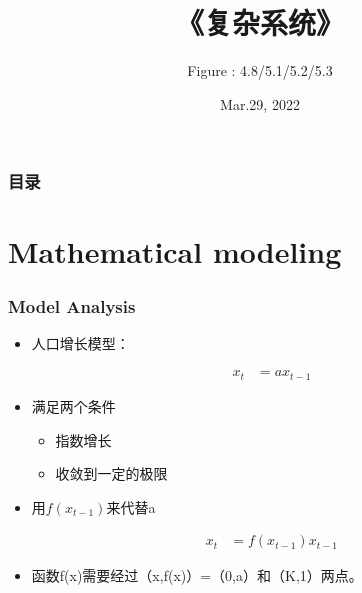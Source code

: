 \documentclass{beamer}
\title[|复杂系统|] %
{《复杂系统》}
\subtitle{Figure : 4.8/5.1/5.2/5.3}
\author[指导老师：王瑞琦] %
{}
\institute[SHU] %
{
  \Large{\begin{block}{\centerline{\large{Shanghai University}}}
  \centerline{\small{College of Sciences-Department of Mathematics}}
  \end{block}}
  \and
  \large{Jie Xing}-\normalsize{Information and Computing Sciences}\\
  \large{Haitao Yan}-\normalsize{Mathematics and Applied Mathematics}\\
  \large{Zhihao Gu}-\normalsize{Mathematics and Applied Mathematics}\\
}
\date[2022-3-29] %
{Mar.29, 2022}
\begin{document}
\frame{\titlepage}


\begin{frame}
\frametitle{目录}
\tableofcontents
\end{frame}

\section{Mathematical modeling}
     \begin{frame}
      \frametitle{Model Analysis \uppercase\expandafter{}}
      

      \begin{itemize}
       \item 人口增长模型：
        \begin{block}{}
		 \begin{equation*}
		  \begin{aligned}
			x_t&=ax_{t-1}
		  \end{aligned}
		 \end{equation*}
        \end{block}
       \item 满足两个条件
        \begin{itemize}
				\item 指数增长
				\item 收敛到一定的极限
			\end{itemize}
	   \item 用$f(x_{t-1})$来代替a
	    \begin{block}{}
		 \begin{equation*}
		  \begin{aligned}
			x_t&=f(x_{t-1})x_{t-1} 
		  \end{aligned}
		 \end{equation*}
        \end{block}
       \item 函数f(x)需要经过（x,f(x)）=（0,a）和（K,1）两点。 
	   
       \end{itemize}
     \end{frame}
\end{document}
